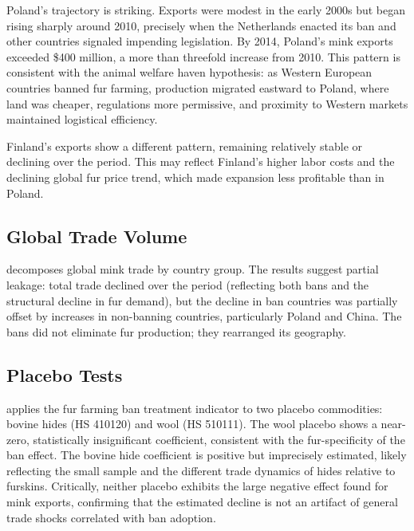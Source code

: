 \documentclass[12pt]{article}
\begin{document}
Poland's trajectory is striking. Exports were modest in the early 2000s but began rising sharply around 2010, precisely when the Netherlands enacted its ban and other countries signaled impending legislation. By 2014, Poland's mink exports exceeded \$400 million, a more than threefold increase from 2010. This pattern is consistent with the animal welfare haven hypothesis: as Western European countries banned fur farming, production migrated eastward to Poland, where land was cheaper, regulations more permissive, and proximity to Western markets maintained logistical efficiency.

Finland's exports show a different pattern, remaining relatively stable or declining over the period. This may reflect Finland's higher labor costs and the declining global fur price trend, which made expansion less profitable than in Poland.



\subsection{Global Trade Volume}

 decomposes global mink trade by country group. The results suggest partial leakage: total trade declined over the period (reflecting both bans and the structural decline in fur demand), but the decline in ban countries was partially offset by increases in non-banning countries, particularly Poland and China. The bans did not eliminate fur production; they rearranged its geography.



\subsection{Placebo Tests}

 applies the fur farming ban treatment indicator to two placebo commodities: bovine hides (HS 410120) and wool (HS 510111). The wool placebo shows a near-zero, statistically insignificant coefficient, consistent with the fur-specificity of the ban effect. The bovine hide coefficient is positive but imprecisely estimated, likely reflecting the small sample and the different trade dynamics of hides relative to furskins. Critically, neither placebo exhibits the large negative effect found for mink exports, confirming that the estimated decline is not an artifact of general trade shocks correlated with ban adoption.
\end{document}
